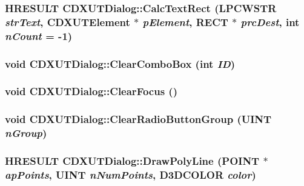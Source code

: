 \hypertarget{class_c_d_x_u_t_dialog_a94d782e76e3e635c67e9d4326dfa9b66}{
\subsubsection[{CalcTextRect}]{\setlength{\rightskip}{0pt plus 5cm}HRESULT CDXUTDialog::CalcTextRect (LPCWSTR {\em strText}, \/  {\bf CDXUTElement} $\ast$ {\em pElement}, \/  RECT $\ast$ {\em prcDest}, \/  {\bf int} {\em nCount} = {\ttfamily -\/1})}}
\label{class_c_d_x_u_t_dialog_a94d782e76e3e635c67e9d4326dfa9b66}
\hypertarget{class_c_d_x_u_t_dialog_a339029982b93647d9a2d3729066b09da}{
\subsubsection[{ClearComboBox}]{\setlength{\rightskip}{0pt plus 5cm}void CDXUTDialog::ClearComboBox ({\bf int} {\em ID})}}
\label{class_c_d_x_u_t_dialog_a339029982b93647d9a2d3729066b09da}
\hypertarget{class_c_d_x_u_t_dialog_ac08c4dea0b23129bb11eae8055d9da27}{
\subsubsection[{ClearFocus}]{\setlength{\rightskip}{0pt plus 5cm}void CDXUTDialog::ClearFocus ()}}
\label{class_c_d_x_u_t_dialog_ac08c4dea0b23129bb11eae8055d9da27}
\hypertarget{class_c_d_x_u_t_dialog_a1d65298121be1454bf5a3b945d19d6e4}{
\subsubsection[{ClearRadioButtonGroup}]{\setlength{\rightskip}{0pt plus 5cm}void CDXUTDialog::ClearRadioButtonGroup (UINT {\em nGroup})}}
\label{class_c_d_x_u_t_dialog_a1d65298121be1454bf5a3b945d19d6e4}
\hypertarget{class_c_d_x_u_t_dialog_ad3345a7a307fa37e32cb3035a127306f}{
\subsubsection[{DrawPolyLine}]{\setlength{\rightskip}{0pt plus 5cm}HRESULT CDXUTDialog::DrawPolyLine (POINT $\ast$ {\em apPoints}, \/  UINT {\em nNumPoints}, \/  D3DCOLOR {\em color})}}
